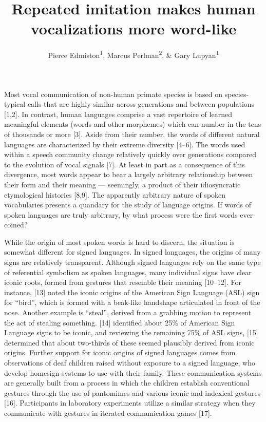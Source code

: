 \documentclass[english,floatsintext,man]{apa6}
\title{Repeated imitation makes human vocalizations more word-like}
\author{Pierce Edmiston\textsuperscript{1}, Marcus Perlman\textsuperscript{2}, \& Gary Lupyan\textsuperscript{1}}
\affiliation{
    \vspace{0.5cm}
          \textsuperscript{1} University of Wisconsin-Madison\\
          \textsuperscript{2} University of Birmingham  }
\theoremstyle{definition}
\theoremstyle{definition}
\theoremstyle{definition}
\theoremstyle{remark}
\begin{document}
\maketitle

\setcounter{secnumdepth}{0}



Most vocal communication of non-human primate species is based on
species-typical calls that are highly similar across generations and
between populations {[}1,2{]}. In contrast, human languages comprise a
vast repertoire of learned meaningful elements (words and other
morphemes) which can number in the tens of thousands or more {[}3{]}.
Aside from their number, the words of different natural languages are
characterized by their extreme diversity {[}4--6{]}. The words used
within a speech community change relatively quickly over generations
compared to the evolution of vocal signals {[}7{]}. At least in part as
a consequence of this divergence, most words appear to bear a largely
arbitrary relationship between their form and their meaning ---
seemingly, a product of their idiosyncratic etymological histories
{[}8,9{]}. The apparently arbitrary nature of spoken vocabularies
presents a quandary for the study of language origins. If words of
spoken languages are truly arbitrary, by what process were the first
words ever coined?

While the origin of most spoken words is hard to discern, the situation
is somewhat different for signed languages. In signed languages, the
origins of many signs are relatively transparent. Although signed
languages rely on the same type of referential symbolism as spoken
languages, many individual signs have clear iconic roots, formed from
gestures that resemble their meaning {[}10--12{]}. For instance,
{[}13{]} noted the iconic origins of the American Sign Language (ASL)
sign for \enquote{bird}, which is formed with a beak-like handshape
articulated in front of the nose. Another example is \enquote{steal},
derived from a grabbing motion to represent the act of stealing
something. {[}14{]} identified about 25\% of American Sign Language
signs to be iconic, and reviewing the remaining 75\% of ASL signs,
{[}15{]} determined that about two-thirds of these seemed plausibly
derived from iconic origins. Further support for iconic origins of
signed languages comes from observations of deaf children raised without
exposure to a signed language, who develop homesign systems to use with
their family. These communication systems are generally built from a
process in which the children establish conventional gestures through
the use of pantomimes and various iconic and indexical gestures
{[}16{]}. Participants in laboratory experiments utilize a similar
strategy when they communicate with gestures in iterated communication
games {[}17{]}.
\end{document}
